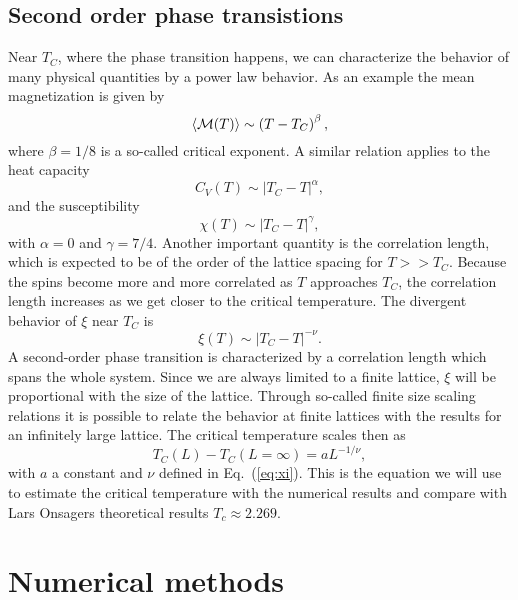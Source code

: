 \documentclass[11pt,a4wide]{article}
\begin{document}
\subsection{Second order phase transistions}
Near $T_C$, where the phase transition happens, we can characterize the behavior of many physical quantities by a power law behavior.
As an example the mean magnetization is given by
\begin{equation}
  \langle {\cal M}(T) \rangle \sim \left(T-T_C\right)^{\beta},
\end{equation}
where $\beta=1/8$ is a so-called critical exponent. A similar relation
applies to the heat capacity 
\begin{equation} 
  C_V(T) \sim \left|T_C-T\right|^{\alpha},
\end{equation}
and the susceptibility
\begin{equation}
  \chi(T) \sim \left|T_C-T\right|^{\gamma},
\end{equation}
with $\alpha = 0$ and $\gamma = 7/4$.
Another important quantity is the correlation length, which is expected
to be of the order of the lattice spacing for $T>> T_C$. Because the spins
become more and more correlated as $T$ approaches $T_C$, the correlation
length increases as we get closer to the critical temperature. The divergent
behavior of $\xi$ near $T_C$ 
is
\begin{equation}
  \xi(T) \sim \left|T_C-T\right|^{-\nu}.
  \label{eq:xi}
\end{equation}
A second-order phase transition is characterized by a
correlation length which spans the whole system.
Since we are always limited to a finite lattice, $\xi$ will
be proportional with the size of the lattice. 
Through so-called finite size scaling relations
it is possible to relate the behavior at finite lattices with the 
results for an infinitely large lattice.
The critical temperature scales then as
\begin{equation}
 T_C(L)-T_C(L=\infty) = aL^{-1/\nu},
 \label{eq:tc}
\end{equation}
with  $a$ a constant and  $\nu$ defined in Eq.~(\ref{eq:xi}). This is the equation we will use to estimate the critical temperature with the numerical results and compare with Lars Onsagers theoretical results $T_c \approx 2.269$. 

\section{Numerical methods}
\end{document}
